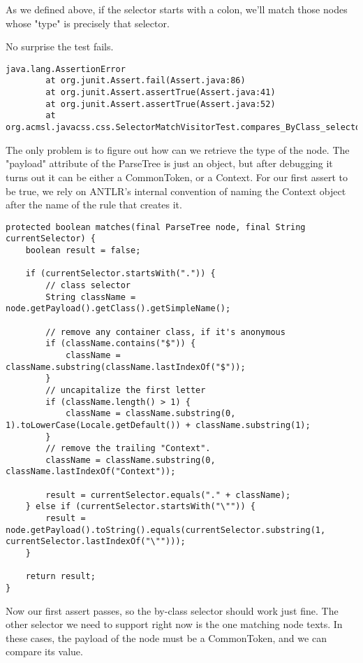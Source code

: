 \documentclass[11pt]{article}
\begin{document}
As we defined above, if the selector starts with a colon, we'll match those nodes whose "type" is
precisely that selector.

No surprise the test fails.

\begin{verbatim}
java.lang.AssertionError
        at org.junit.Assert.fail(Assert.java:86)
        at org.junit.Assert.assertTrue(Assert.java:41)
        at org.junit.Assert.assertTrue(Assert.java:52)
        at org.acmsl.javacss.css.SelectorMatchVisitorTest.compares_ByClass_selectors_correctly(SelectorMatchVisitorTest.java:100)
\end{verbatim}

The only problem is to figure out how can we retrieve the type of the node. The "payload" attribute of the ParseTree
is just an object, but after debugging it turns out it can be either a CommonToken, or a Context.
For our first assert to be true, we rely on ANTLR's internal convention of naming the Context object after the
name of the rule that creates it.

\begin{verbatim}
protected boolean matches(final ParseTree node, final String currentSelector) {
    boolean result = false;

    if (currentSelector.startsWith(".")) {
        // class selector
        String className = node.getPayload().getClass().getSimpleName();

        // remove any container class, if it's anonymous
        if (className.contains("$")) {
            className = className.substring(className.lastIndexOf("$"));
        }
        // uncapitalize the first letter
        if (className.length() > 1) {
            className = className.substring(0, 1).toLowerCase(Locale.getDefault()) + className.substring(1);
        }
        // remove the trailing "Context".
        className = className.substring(0, className.lastIndexOf("Context"));

        result = currentSelector.equals("." + className);
    } else if (currentSelector.startsWith("\"")) {
        result = node.getPayload().toString().equals(currentSelector.substring(1, currentSelector.lastIndexOf("\"")));
    }

    return result;
}
\end{verbatim}

Now our first assert passes, so the by-class selector should work just fine. The other selector we need to support
right now is the one matching node texts. In these cases, the payload of the node must be a CommonToken, and we can
compare its value.
\end{document}
